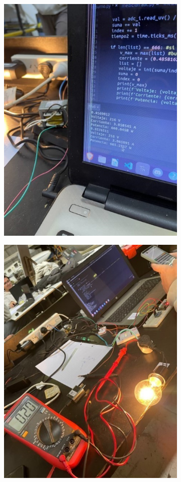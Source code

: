 \begin{figure}[H]

\begin{subfigure}{0.5\textwidth}
\includegraphics[width=0.9\linewidth]{informes/Screenshot_6.jpg} 
\caption{}
\end{subfigure}
\begin{subfigure}{0.5\textwidth}
\includegraphics[width=0.9\linewidth]{informes/Screenshot_8.jpg}

\end{subfigure}
\end{figure}
